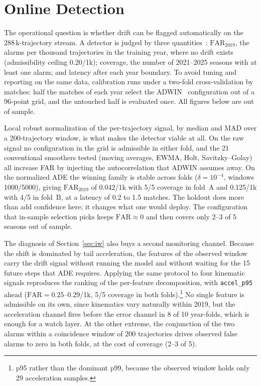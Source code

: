 \documentclass[conference]{IEEEtran}
\newif\ifmarkchanges
\newcommand{\ins}[1]{\ifmarkchanges\hl{\footnotesize[+ #1]}\fi}
\begin{document}
\section{Online Detection}
\label{sec:detection}

The operational question is whether drift can be flagged automatically on the
288\,k-trajectory stream. A detector is judged by three quantities~\cite{lu2019}:
$\mathrm{FAR}_{2019}$, the alarms per thousand trajectories in the training
year, where no drift exists \ins{e todo alarme e falso} (admissibility ceiling
0.20/1k); coverage, the number of 2021--2025 seasons with at least one alarm;
and latency after each
year boundary. To avoid tuning and reporting on the same data, calibration runs
under a two-fold cross-validation by matches: half the matches of each year
select the ADWIN~\cite{adwin} configuration out of a 96-point grid, and the
untouched half is evaluated once. All figures below are out of sample.

Local robust normalization of the per-trajectory signal, by median and MAD over
a 200-trajectory window, is what makes the detector viable at all. On the raw
signal no configuration in the grid is admissible in either fold, and the 21
conventional smoothers tested (moving averages, EWMA, Holt, Savitzky--Golay)
all increase FAR by injecting the autocorrelation that ADWIN assumes away. On
the normalized ADE the winning family is stable across folds
($\delta = 10^{-4}$, windows 1000/5000), giving $\mathrm{FAR}_{2019}$ of
0.042/1k with 5/5 coverage in fold~A and 0.125/1k with 4/5 in fold~B, at a
latency of 0.2 to 1.5 matches. The holdout does more than add confidence here; it changes what one would
deploy. The configuration that in-sample selection picks keeps
$\mathrm{FAR} \approx 0$ and then covers only 2--3 of 5 seasons out of sample.

The diagnosis of Section~\ref{sec:iw} also buys a second monitoring channel.
Because the shift is dominated by tail acceleration, the features of the
observed window carry the drift signal without running the model and without
waiting for the 15 future steps that ADE requires. Applying the same protocol
to four kinematic signals reproduces the ranking of the per-feature
decomposition, with \texttt{accel\_p95} ahead
($\mathrm{FAR} = 0.25$--$0.29$/1k, 5/5 coverage in both folds).\footnote{p95
rather than the dominant p99, because the observed window holds only 29
acceleration samples.} No single feature is admissible on its own, since
kinematics vary naturally within 2019, but the acceleration channel fires
before the error channel in 8 of 10 year-folds, which is enough for a watch
layer. At the other extreme, the conjunction of the two alarms within a
coincidence window of 200 trajectories drives observed false alarms to zero in
both folds, at the cost of coverage (2--3 of 5).
\end{document}
